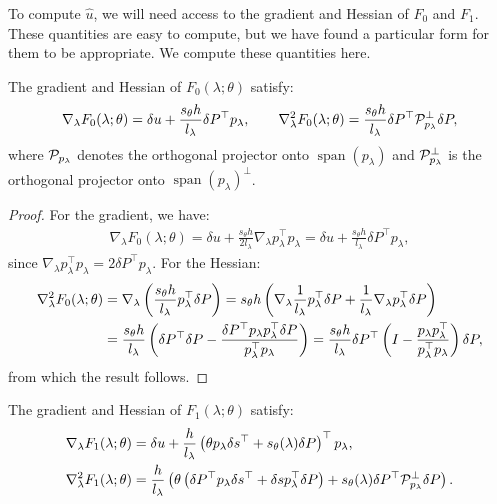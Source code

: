 \documentclass[eikonal.tex]{subfiles}
\begin{document}
To compute $\hat{u}$, we will need access to the gradient and Hessian
of $F_0$ and $F_1$. These quantities are easy to compute, but we have
found a particular form for them to be appropriate. We compute these
quantities here.

\begin{lemma}\label{lemma:F0-grad-and-Hess}
  The gradient and Hessian of $F_0(\lambda; \theta)$ satisfy:
  \begin{align*}
    \nabla_\lambda F_0(\lambda; \theta) = \delta u + \frac{s_\theta h}{l_\lambda} \delta P^\top p_\lambda, \qquad
    \nabla^2_\lambda F_0(\lambda; \theta) = \frac{s_\theta h}{l_\lambda} \delta P^\top \mathcal{P}^\perp_{p_\lambda} \delta P,
  \end{align*}
  where $\mathcal{P}_{p_\lambda}$ denotes the orthogonal projector onto
  $\operatorname{span}(p_\lambda)$ and $\mathcal{P}_{p_\lambda}^\perp$ is
  the orthogonal projector onto
  $\operatorname{span}(p_\lambda)^\perp$.
\end{lemma}

\begin{proof}
  For the gradient, we have:
  \begin{align*}
    \nabla_\lambda F_0(\lambda; \theta) = \delta u + \frac{s_\theta h}{2 l_\lambda} \nabla_\lambda p_\lambda^\top p_\lambda = \delta u + \frac{s_\theta h}{l_\lambda} \delta P^\top p_\lambda,
  \end{align*}
  since
  $\nabla_\lambda p_\lambda^\top p_\lambda = 2 \delta P^\top
  p_\lambda$. For the Hessian:
  \begin{align*}
    \nabla^2_\lambda F_0(\lambda; \theta) &= \nabla_\lambda \left(\frac{s_\theta h}{l_\lambda} p_\lambda^\top \delta P\right) = s_\theta h \left(\nabla_\lambda \frac{1}{l_\lambda} p_\lambda^\top \delta P + \frac{1}{l_\lambda} \nabla_\lambda p_\lambda^\top \delta P\right) \\
    &= \frac{s_\theta h}{l_\lambda} \left(\delta P^\top \delta P - \frac{\delta P^\top p_\lambda p_\lambda^\top \delta P}{p_\lambda^\top p_\lambda}\right) = \frac{s_\theta h}{l_\lambda} \delta P^\top \left(I - \frac{p_\lambda p_\lambda^\top}{p_\lambda^\top p_\lambda}\right) \delta P,
  \end{align*}
  from which the result follows.
\end{proof}

\begin{lemma}
  The gradient and Hessian of $F_1(\lambda; \theta)$ satisfy:
  \begin{align*}
    \nabla_\lambda F_1(\lambda; \theta) &= \delta u + \frac{h}{l_\lambda} \left(\theta p_\lambda \delta s^\top + s_\theta(\lambda) \delta P\right)^\top p_\lambda, \\
    \nabla_\lambda^2 F_1(\lambda; \theta) &= \frac{h}{l_\lambda} \left(\theta \left(\delta P^\top p_\lambda \delta s^\top + \delta s p_\lambda^\top \delta P\right) + s_\theta(\lambda) \delta P^\top \mathcal{P}^\perp_{p_\lambda} \delta P\right).
  \end{align*}
\end{lemma}
\end{document}
